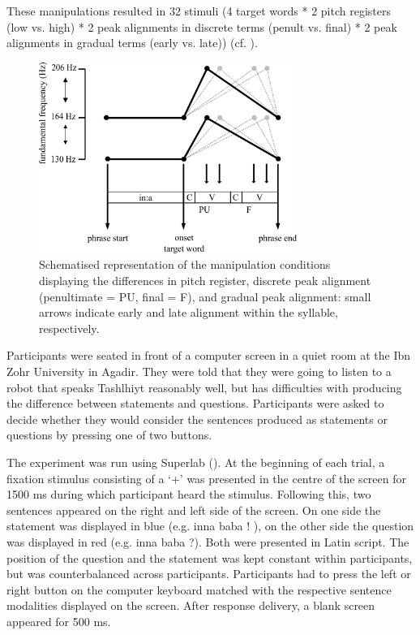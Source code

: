 \largerpage[-2]
These manipulations resulted in 32 stimuli (4 target words * 2 pitch registers (low vs. high) * 2 peak alignments in discrete terms (penult vs. final) * 2 peak alignments in gradual terms (early vs. late)) (cf. ).

  \begin{figure}[t]
  \centering 
   \includegraphics[width=0.75\textwidth]{figures/Figure_5_11_conditions.png}
  \caption{Schematised representation of the manipulation conditions displaying the differences in pitch register, discrete peak alignment (penultimate = PU, final = F), and gradual peak alignment: small arrows indicate early and late alignment within the syllable, respectively.}
   \label{fig:5.11}
   \end{figure}

Participants were seated in front of a computer screen in a quiet room at the Ibn Zohr University in Agadir. They were told that they were going to listen to a robot that speaks Tashlhiyt reasonably well, but has difficulties with producing the difference between statements and questions. Participants were asked to decide whether they would consider the sentences produced as statements or questions by pressing one of two buttons. 

The experiment was run using Superlab (\citealt{Haxby.etal1993}). At the beginning of each trial, a fixation stimulus consisting of a ‘+’ was presented in the centre of the screen for 1500 ms during which participant heard the stimulus. Following this, two sentences appeared on the right and left side of the screen. On one side the statement was displayed in blue (e.g. inna baba ! ), on the other side the question was displayed in red (e.g. inna baba ?). Both were presented in Latin script. The position of the question and the statement was kept constant within participants, but was counterbalanced across participants. Participants had to press the left or right button on the computer keyboard matched with the respective sentence modalities displayed on the screen. After response delivery, a blank screen appeared for 500 ms. 

